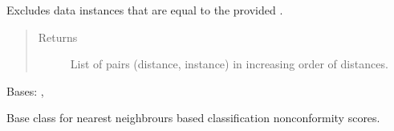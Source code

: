 \documentclass[letterpaper,10pt,english]{sphinxmanual}
\begin{document}
\begin{fulllineitems}
\begin{fulllineitems}
Excludes data instances that are equal to the provided .
\begin{quote}\begin{description}
\item[{Returns}] \leavevmode
List of pairs (distance, instance) in increasing order of distances.

\end{description}\end{quote}

\end{fulllineitems}


\end{fulllineitems}


\begin{fulllineitems}
\label{cp.nonconformity:cp.nonconformity.ClassNearestNeighboursNC}
Bases: {\hyperref[cp.nonconformity:cp.nonconformity.NearestNeighbours]{}}, {\hyperref[cp.nonconformity:cp.nonconformity.ClassNC]{}}

Base class for nearest neighbrours based classification nonconformity scores.

\end{fulllineitems}

\end{document}
